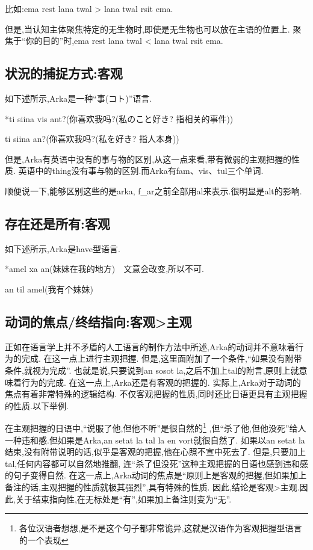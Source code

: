 比如:\quad ema rest lana twal > lana twal rsit ema.

但是,当认知主体聚焦特定的无生物时,即使是无生物也可以放在主语的位置上.
聚焦于“你的目的”时,ema rest lana twal < lana twal rsit ema.

\subsection{状況的捕捉方式:客观}

如下述所示,Arka是一种``事(コト)''语言.

*ti siina vis ant?(你喜欢我吗?(私のこと好き? 指相关的事件))

ti siina an?(你喜欢我吗?(私を好き? 指人本身))

但是,Arka有英语中没有的事与物的区别,从这一点来看,带有微弱的主观把握的性质.
英语中的thing没有事与物的区别.而Arka有fam、vis、tul三个单词.

顺便说一下,能够区别这些的是arka, f\_ar之前全部用al来表示.很明显是alt的影响.

\subsection{存在还是所有:客观}

如下述所示,Arka是have型语言.

*amel xa an(妹妹在我的地方)　文意会改变,所以不可.

an til amel(我有个妹妹)

\subsection{动词的焦点/终结指向:客观>主观}

正如在语言学上并不矛盾的人工语言的制作方法中所述,Arka的动词并不意味着行为的完成.
在这一点上进行主观把握.
但是,这里面附加了一个条件,“如果没有附带条件,就视为完成”.
也就是说,只要说到an sosot la,之后不加上tal的附言,原则上就意味着行为的完成.
在这一点上,Arka还是有客观的把握的.
实际上,Arka对于动词的焦点有着非常特殊的逻辑结构.
不仅客观把握的性质,同时还比日语更具有主观把握的性质.以下举例.

在主观把握的日语中,“说服了他,但他不听”是很自然的\footnote{各位汉语者想想,是不是这个句子都非常诡异,这就是汉语作为客观把握型语言的一个表现}
,但“杀了他,但他没死”给人一种违和感.但如果是Arka,an setat la tal la en vort就很自然了.
如果以an setat la结束,没有附带说明的话,似乎是客观的把握,他在心照不宣中死去了.
但是,只要加上tal,任何内容都可以自然地推翻,
连“杀了但没死”这种主观把握的日语也感到违和感的句子变得自然.
在这一点上,Arka动词的焦点是“原则上是客观的把握,但如果加上备注的话,主观把握的性质就极其强烈”,具有特殊的性质.
因此,结论是客观>主观.因此,关于结束指向性,在无标处是“有”,如果加上备注则变为“无”.

